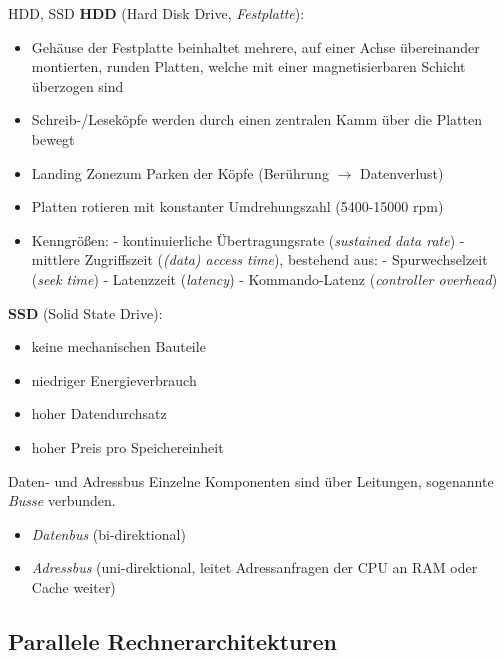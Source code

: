 \documentclass[german]{spicker}
\begin{document}
\begin{bonus}{HDD, SSD}
    \textbf{HDD} (Hard Disk Drive, \emph{Festplatte}):
    \begin{itemize}
        \item Gehäuse der Festplatte beinhaltet mehrere, auf einer Achse übereinander montierten, runden Platten, welche mit einer magnetisierbaren Schicht überzogen sind
        \item Schreib-/Leseköpfe werden durch einen zentralen Kamm über die Platten bewegt
        \item \glqq Landing Zone\grqq zum Parken der Köpfe (Berührung $\to$ Datenverlust)
        \item Platten rotieren mit konstanter Umdrehungszahl (5400-15000 rpm)
        \item Kenngrößen:
              \subitem - kontinuierliche Übertragungsrate (\emph{sustained data rate})
              \subitem - mittlere Zugriffszeit (\emph{(data) access time}), bestehend aus:
              \subsubitem - Spurwechselzeit (\emph{seek time})
              \subsubitem - Latenzzeit (\emph{latency})
              \subsubitem - Kommando-Latenz (\emph{controller overhead})
    \end{itemize}


    \textbf{SSD} (Solid State Drive):
    \begin{itemize}
        \item keine mechanischen Bauteile
        \item niedriger Energieverbrauch
        \item hoher Datendurchsatz
        \item hoher Preis pro Speichereinheit
    \end{itemize}
\end{bonus}

\begin{bonus}{Daten- und Adressbus}
    Einzelne Komponenten sind über Leitungen, sogenannte \emph{Busse} verbunden.
    \begin{itemize}
        \item \emph{Datenbus} (bi-direktional)
        \item \emph{Adressbus} (uni-direktional, leitet Adressanfragen der CPU an RAM oder Cache weiter)
    \end{itemize}
\end{bonus}

\subsection{Parallele Rechnerarchitekturen}
\end{document}
